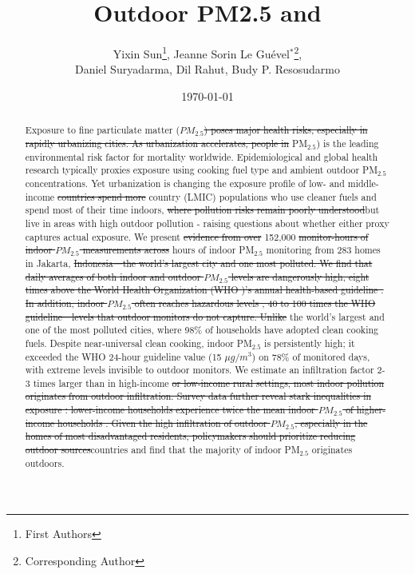 \documentclass[reqno,12pt,notitlepage]{article}
\title{\DIFdelbegin \DIFdel{High Indoor Air Pollution in a Developing Megacity: The Role of }\DIFdelend \DIFaddbegin \DIFadd{Beyond Stoves and }\DIFaddend Outdoor \DIFaddbegin \DIFadd{Monitors: Indoor }\DIFaddend PM2.5 \DIFaddbegin \DIFadd{Exposure }\DIFaddend and \DIFdelbegin \DIFdel{Household Characteristics}\DIFdelend \DIFaddbegin \DIFadd{Inequality in a Fast Growing Megacity}\DIFaddend }
\author{Yixin Sun\footnote{First Authors}, Jeanne Sorin Le Gu\'{e}vel$^*$\footnote{Corresponding Author}, \\ Daniel Suryadarma, Dil Rahut, Budy P. Resosudarmo}
\date{\today}
\providecommand{\DIFadd}[1]{{\protect\color{BLUE}#1}} %
\providecommand{\DIFdel}[1]{{\protect\color{red}\sout{#1}}} %
\providecommand{\DIFaddbegin}{} %
\providecommand{\DIFaddend}{} %
\providecommand{\DIFdelbegin}{} %
\providecommand{\DIFdelend}{} %
\begin{document}
\maketitle

\begin{abstract}
Exposure to fine particulate matter (\DIFdelbegin \DIFdel{$PM_{2.5}$) poses major health risks, especially in rapidly urbanizing cities. As urbanization accelerates, people in }\DIFdelend \DIFaddbegin \DIFadd{PM$_{2.5}$) is the leading environmental risk factor for mortality worldwide. Epidemiological and global health research typically proxies exposure using cooking fuel type and ambient outdoor PM$_{2.5}$ concentrations. Yet urbanization is changing the exposure profile of }\DIFaddend low- and middle-income \DIFdelbegin \DIFdel{countries spend more }\DIFdelend \DIFaddbegin \DIFadd{country (LMIC) populations who use cleaner fuels and spend most of their }\DIFaddend time indoors, \DIFdelbegin \DIFdel{where pollution risks remain poorly understood}\DIFdelend \DIFaddbegin \DIFadd{but live in areas with high outdoor pollution - raising questions about whether either proxy captures actual exposure}\DIFaddend .
We present \DIFdelbegin \DIFdel{evidence from over }\DIFdelend 152,000 \DIFdelbegin \DIFdel{monitor-hours of indoor $PM_{2.5}$ measurements across }\DIFdelend \DIFaddbegin \DIFadd{hours of indoor PM$_{2.5}$ monitoring from 283 }\DIFaddend homes in Jakarta, \DIFdelbegin \DIFdel{Indonesia---the world's largest city and one most polluted. We find that daily averages of both indoor and outdoor $PM_{2.5}$ levels are dangerously high, eight times above the World Health Organization (WHO )'s annual health-based guideline . In addition, indoor  $PM_{2.5}$ often reaches hazardous levels , 40 to 100 times the WHO guideline---levels that outdoor monitors do not capture. Unlike }\DIFdelend \DIFaddbegin \DIFadd{the world's largest and one of the most polluted cities, where 98\% of households have adopted clean cooking fuels.
Despite near-universal clean cooking, indoor PM$_{2.5}$ is persistently high; it exceeded the WHO 24-hour guideline value (15 $\mu g/m^3$) on 78\% of monitored days, with extreme levels invisible to outdoor monitors. We estimate an infiltration factor 2-3 times larger than }\DIFaddend in high-income \DIFdelbegin \DIFdel{or low-income rural settings, most indoor pollution originates from outdoor infiltration.
Survey data further reveal stark inequalities in exposure : lower-income households experience twice the mean indoor $PM_{2.5}$ of higher-income households . 
Given the high infiltration of outdoor $PM_{2.5}$, especially in the homes of most disadvantaged residents, policymakers should prioritize reducing outdoor sources}\DIFdelend \DIFaddbegin \DIFadd{countries and find that the majority of indoor PM$_{2.5}$ originates outdoors.
}
\end{abstract}
\end{document}
